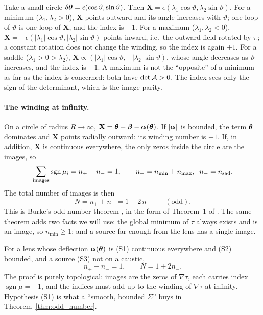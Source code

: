 \begin{derivation}
Take a small circle $\delta\boldsymbol{\theta}=\epsilon(\cos\vartheta,\sin\vartheta)$.
Then $\mathbf X=\epsilon(\lambda_1\cos\vartheta,\lambda_2\sin\vartheta)$.
For a minimum ($\lambda_1,\lambda_2>0$), $\mathbf X$ points outward
and its angle increases with $\vartheta$; one loop of
$\vartheta$ is one loop of $\mathbf X$, and the index is $+1$.
For a maximum ($\lambda_1,\lambda_2<0$), $\mathbf X=-\epsilon(|\lambda_1|\cos\vartheta,|\lambda_2|\sin\vartheta)$
points inward, i.e.\ the outward field rotated by $\pi$; a
constant rotation does not change the winding, so the index is again $+1$.
For a saddle ($\lambda_1>0>\lambda_2$), $\mathbf X\propto(|\lambda_1|\cos\vartheta,-|\lambda_2|\sin\vartheta)$,
whose angle decreases as $\vartheta$ increases, and the index is $-1$.
A maximum is not the ``opposite'' of a minimum as far as the index is
concerned: both have $\det\mathcal{A}>0$.  The index sees only the sign of the
determinant, which is the image parity.
\end{derivation}

\paragraph{The winding at infinity.}
On a circle of radius $R\to\infty$,
$\mathbf X=\boldsymbol{\theta}-\boldsymbol{\beta}-\boldsymbol{\alpha}(\boldsymbol{\theta})$.  If $|\boldsymbol{\alpha}|$
is bounded, the term $\boldsymbol{\theta}$ dominates and $\mathbf X$ points
radially outward: its winding number is $+1$.  If, in addition,
$\mathbf X$ is continuous everywhere, the only zeros inside the circle
are the images, so
\begin{equation}
    \sum_{\text{images}}\operatorname{sgn}\mu_i = n_+ - n_- = 1,
    \qquad n_+ = n_{\min}+n_{\max},\;\; n_- = n_{\rm sad}.
    \label{eq:oi_index_sum}
\end{equation}
The total number of images is then
\begin{equation}
    N = n_+ + n_- = 1 + 2\,n_- \qquad (\text{odd}).
    \label{eq:oi_burke}
\end{equation}
This is Burke's odd-number theorem \citep{burke_1981}, in the form of
Theorem~1 of \citet[][Sect.~5.4.1]{schneider_ehlers_falco_1992}.  The
same theorem adds two facts we will use: the global minimum of $\tau$
always exists and is an image, so $n_{\min}\ge 1$; and a source far
enough from the lens has a single image.

\begin{keybox}
For a lens whose deflection $\boldsymbol{\alpha}(\boldsymbol{\theta})$ is (S1) continuous
everywhere and (S2) bounded, and a source (S3) not on a caustic,
\[
  n_+ - n_- = 1, \qquad N = 1 + 2n_- .
\]
The proof is purely topological: images are the zeros of $\nabla\tau$,
each carries index $\operatorname{sgn}\mu=\pm 1$, and the indices must
add up to the winding of $\nabla\tau$ at infinity.  Hypothesis (S1) is
what a ``smooth, bounded $\Sigma$'' buys in
Theorem~\ref{thm:odd_number}.
\end{keybox}

